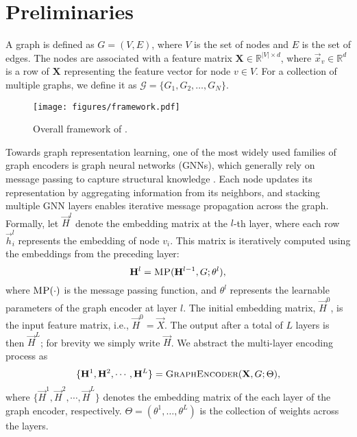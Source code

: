 \section{Preliminaries}\label{sec.preliminaries}
A graph is defined as \( G = (V, E) \), where \( V \) is the set of nodes and \( E \) is the set of edges. The nodes are associated with a feature matrix $\mathbf{X} \in \mathbb{R}^{|V| \times d}$, where \( \vec{x}_v \in \mathbb{R}^d \) is a row of $\mathbf{X}$ representing the feature vector for node \( v \in V \). For a collection of multiple graphs, we define it as \( \mathcal{G} = \{ G_1, G_2, \dots, G_N \} \).

\begin{figure*}[t]
\centering
\texttt{[image: figures/framework.pdf]}
\caption{Overall framework of \model.}
\label{fig.framework}
\end{figure*}


Towards graph representation learning, one of the most widely used families of graph encoders is graph neural networks (GNNs), which generally rely on message passing to capture structural knowledge \cite{wu2020comprehensive,zhou2020graph}. Each node updates its representation by aggregating information from its neighbors, and stacking multiple GNN layers enables iterative message propagation across the graph.
Formally, let $\vec{H}^l$ denote the embedding matrix at the $l$-th layer, where each row $\vec{h}_i^l$ represents the embedding of node $v_i$. This matrix is iteratively computed using the embeddings from the preceding layer:
\begin{equation}\label{eq.gnn}
\vec{H}^l = \textsc{MP}(\vec{H}^{l-1},G;\theta^l),
\end{equation}
where $\textsc{MP}(\cdot)$ is the message passing function, and $\theta^l$ represents the learnable parameters of the graph encoder at layer $l$. The initial embedding matrix, $\vec{H}^0$, is the input feature matrix, i.e., $\vec{H}^0=\vec{X}$. The output after a total of $L$ layers is then $\vec{H}^L$; for brevity we simply write $\vec{H}$. We abstract the multi-layer encoding process as 
\begin{align}
    \{\vec{H}^1, \vec{H}^2, \cdots, \vec{H}^L\} = \textsc{GraphEncoder}(\vec{X},G;\Theta),
\end{align}
where $\{\vec{H}^1, \vec{H}^2, \cdots, \vec{H}^L\}$ denotes the embedding matrix of the each layer of the graph encoder, respectively. $\Theta=(\theta^1,\ldots,\theta^L)$ is the collection of weights across the layers.

